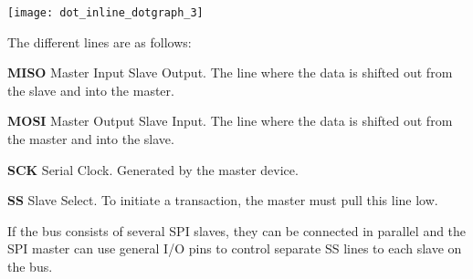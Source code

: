 \label{group__asfdoc__sam0__sercom__spi__group_asfdoc_sam0_spi_connection_example}%
%

\begin{DoxyImageNoCaption}
  \mbox{\texttt{[image: dot\_inline\_dotgraph\_3]}}
\end{DoxyImageNoCaption}


The different lines are as follows\+:
\begin{DoxyItemize}
\item {\bfseries{M\+I\+SO}} Master Input Slave Output. The line where the data is shifted out from the slave and into the master.
\item {\bfseries{M\+O\+SI}} Master Output Slave Input. The line where the data is shifted out from the master and into the slave.
\item {\bfseries{S\+CK}} Serial Clock. Generated by the master device.
\item {\bfseries{SS}} Slave Select. To initiate a transaction, the master must pull this line low.
\end{DoxyItemize}

If the bus consists of several S\+PI slaves, they can be connected in parallel and the S\+PI master can use general I/O pins to control separate SS lines to each slave on the bus.

